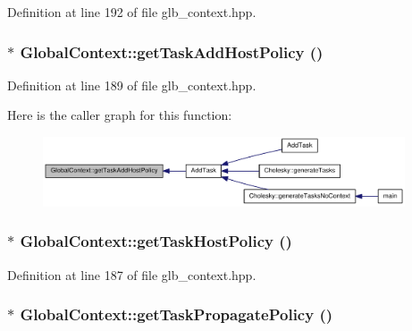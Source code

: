 Definition at line 192 of file glb\_\-context.hpp.\hypertarget{class_global_context_aac8e417def6e6fc45699a87bf412f745}{
\subsubsection[{getTaskAddHostPolicy}]{$\ast$ GlobalContext::getTaskAddHostPolicy ()}}
\label{class_global_context_aac8e417def6e6fc45699a87bf412f745}


Definition at line 189 of file glb\_\-context.hpp.

Here is the caller graph for this function:\nopagebreak
\begin{figure}[H]
\begin{center}
\leavevmode
\includegraphics[width=304pt]{class_global_context_aac8e417def6e6fc45699a87bf412f745_icgraph}
\end{center}
\end{figure}
\hypertarget{class_global_context_ade353fcc225ba76065ff6fca6924e944}{
\subsubsection[{getTaskHostPolicy}]{$\ast$ GlobalContext::getTaskHostPolicy ()}}
\label{class_global_context_ade353fcc225ba76065ff6fca6924e944}


Definition at line 187 of file glb\_\-context.hpp.\hypertarget{class_global_context_a70524a314df10d540b267f34d297ec49}{
\subsubsection[{getTaskPropagatePolicy}]{$\ast$ GlobalContext::getTaskPropagatePolicy ()}}
\label{class_global_context_a70524a314df10d540b267f34d297ec49}


